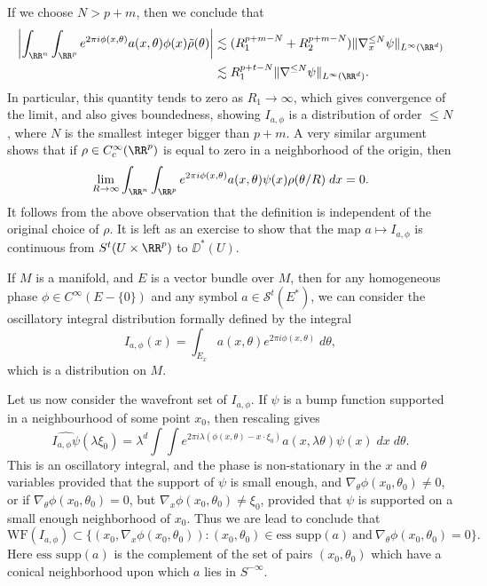 %
If we choose $N > p + m$, then we conclude that
%
\begin{align*}
    \left| \int_{\RR^n} \int_{\RR^p} e^{2 \pi i \phi(x,\theta)} a(x,\theta) \phi(x) \tilde{\rho}(\theta) \right| &\lesssim (R_1^{p + m - N} + R_2^{p + m - N}) \| \nabla^{\leq N}_x \psi \|_{L^\infty(\RR^d)}\\
    &\lesssim R_1^{p + t - N} \| \nabla^{\leq N} \psi \|_{L^\infty(\RR^d)}.
\end{align*}
%
In particular, this quantity tends to zero as $R_1 \to \infty$, which gives convergence of the limit, and also gives boundedness, showing $I_{a,\phi}$ is a distribution of order $\leq N$, where $N$ is the smallest integer bigger than $p + m$. A very similar argument shows that if $\rho \in C_c^\infty(\RR^p)$ is equal to zero in a neighborhood of the origin, then
%
\[ \lim_{R \to \infty} \int_{\RR^n} \int_{\RR^p} e^{2 \pi i \phi(x,\theta)} a(x,\theta) \psi(x) \rho(\theta / R)\; dx = 0. \]
%
It follows from the above observation that the definition is independent of the original choice of $\rho$. It is left as an exercise to show that the map $a \mapsto I_{a,\phi}$ is continuous from $S^t(U \times \RR^p)$ to $\DD^*(U)$.

\begin{remark}
    If $M$ is a manifold, and $E$ is a vector bundle over $M$, then for any homogeneous phase $\phi \in C^\infty(E - \{ 0 \})$ and any symbol $a \in \mathcal{S}^t(E^*)$, we can consider the oscillatory integral distribution formally defined by the integral
    \[ I_{a,\phi}(x) = \int_{E_x} a(x,\theta) e^{2 \pi i \phi(x,\theta)}\; d\theta, \]
    which is a distribution on $M$.
\end{remark}

Let us now consider the wavefront set of $I_{a,\phi}$. If $\psi$ is a bump function supported in a neighbourhood of some point $x_0$, then rescaling gives
%
\[ \widehat{I_{a,\phi} \psi}(\lambda \xi_0) = \lambda^d \int \int e^{2 \pi i \lambda (\phi(x,\theta) - x \cdot \xi_0)} a(x,\lambda \theta) \psi(x)\; dx\; d\theta. \]
%
This is an oscillatory integral, and the phase is non-stationary in the $x$ and $\theta$ variables provided that the support of $\psi$ is small enough, and $\nabla_\theta \phi(x_0,\theta_0) \neq 0$, or if $\nabla_\theta \phi(x_0,\theta_0) = 0$, but $\nabla_x \phi(x_0,\theta_0) \neq \xi_0$, provided that $\psi$ is supported on a small enough neighborhood of $x_0$. Thus we are lead to conclude that
%
\[ \text{WF}(I_{a,\phi}) \subset \{ (x_0,\nabla_x \phi(x_0,\theta_0)): (x_0,\theta_0) \in \text{ess supp}(a)\ \text{and}\ \nabla_\theta \phi(x_0,\theta_0) = 0 \}. \]
%
Here $\text{ess supp}(a)$ is the complement of the set of pairs $(x_0,\theta_0)$ which have a conical neighborhood upon which $a$ lies in $S^{-\infty}$.

